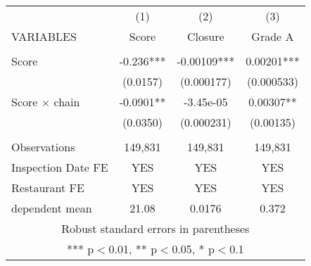 \begin{tabular}{lccc} \hline
 & (1) & (2) & (3) \\
VARIABLES & Score & Closure & Grade A \\ \hline
 &  &  &  \\
Score & -0.236*** & -0.00109*** & 0.00201*** \\
 & (0.0157) & (0.000177) & (0.000533) \\
Score $\times$ chain & -0.0901** & -3.45e-05 & 0.00307** \\
 & (0.0350) & (0.000231) & (0.00135) \\
 &  &  &  \\
Observations & 149,831 & 149,831 & 149,831 \\
Inspection Date FE & YES & YES & YES \\
Restaurant FE & YES & YES & YES \\
 dependent mean & 21.08 & 0.0176 & 0.372 \\ \hline
\multicolumn{4}{c}{ Robust standard errors in parentheses} \\
\multicolumn{4}{c}{ *** p$<$0.01, ** p$<$0.05, * p$<$0.1} \\
\end{tabular}
